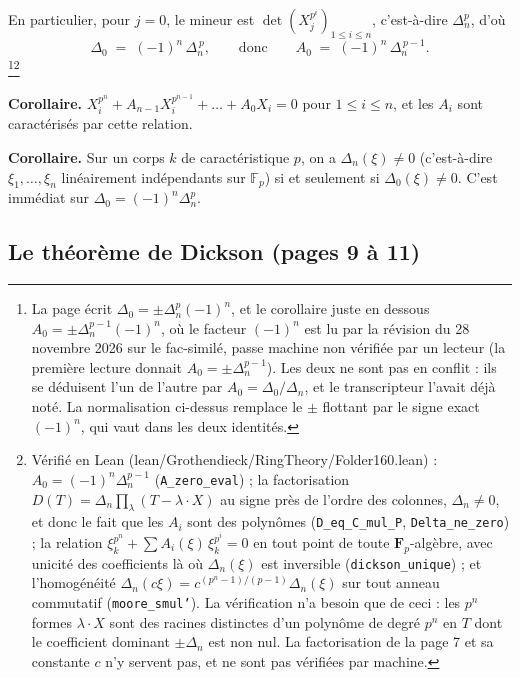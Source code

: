 \documentclass[11pt,a4paper]{article}
\begin{document}
En particulier, pour $j = 0$, le mineur est $\det(X_j^{p^i})_{1 \leqslant i
\leqslant n}$, c'est-à-dire $\Delta_n^p$, d'où
\[
  \Delta_0 \;=\; (-1)^n\, \Delta_n^{\,p} ,
  \qquad\text{donc}\qquad
  A_0 \;=\; (-1)^n\, \Delta_n^{\,p-1} .
\]
\footnote{La page écrit $\Delta_0 = \pm \Delta_n^p (-1)^n$, et le corollaire
juste en dessous $A_0 = \pm \Delta_n^{p-1} (-1)^n$, où le facteur $(-1)^n$
est lu par la révision du 28 novembre 2026 sur le fac-similé, passe machine non
vérifiée par un lecteur (la première lecture donnait $A_0 = \pm
\Delta_n^{p-1}$). Les deux ne sont pas en conflit :
ils se déduisent l'un de l'autre par $A_0 = \Delta_0/\Delta_n$, et le
transcripteur l'avait déjà noté. La normalisation ci-dessus remplace le
$\pm$ flottant par le signe exact $(-1)^n$, qui vaut dans les deux
identités.}\footnote{Vérifié en Lean (lean/Grothendieck/RingTheory/Folder160.lean) :
$A_0 = (-1)^n \Delta_n^{p-1}$ (\texttt{A\_zero\_eval}) ; la factorisation
$D(T) = \Delta_n \prod_\lambda (T - \lambda \cdot X)$ au signe près de
l'ordre des colonnes, $\Delta_n \neq 0$, et donc le fait que les $A_i$ sont des
polynômes (\texttt{D\_eq\_C\_mul\_P}, \texttt{Delta\_ne\_zero}) ; la relation
$\xi_k^{p^n} + \sum A_i(\xi)\,\xi_k^{p^i} = 0$ en tout point de toute
$\mathbf{F}_p$-algèbre, avec unicité des coefficients là où $\Delta_n(\xi)$ est
inversible (\texttt{dickson\_unique}) ; et l'homogénéité $\Delta_n(c\xi) =
c^{(p^n-1)/(p-1)}\Delta_n(\xi)$ sur tout anneau commutatif
(\texttt{moore\_smul'}). La vérification n'a besoin que de ceci : les $p^n$
formes $\lambda \cdot X$ sont des racines distinctes d'un polynôme de degré
$p^n$ en $T$ dont le coefficient dominant $\pm\Delta_n$ est non nul. La
factorisation de la page 7 et sa constante $c$ n'y servent pas, et ne sont pas
vérifiées par machine.}

\textbf{Corollaire.} $X_i^{p^n} + A_{n-1}X_i^{p^{n-1}} + \dots + A_0 X_i = 0$
pour $1 \leqslant i \leqslant n$, et les $A_i$ sont caractérisés par cette
relation.

\textbf{Corollaire.} Sur un corps $k$ de caractéristique $p$, on a
$\Delta_n(\xi) \neq 0$ (c'est-à-dire $\xi_1, \dots, \xi_n$ linéairement
indépendants sur $\mathbb{F}_p$) si et seulement si $\Delta_0(\xi) \neq 0$.
C'est immédiat sur $\Delta_0 = (-1)^n \Delta_n^p$.

\subsection*{Le théorème de Dickson (pages 9 à 11)}
\end{document}
